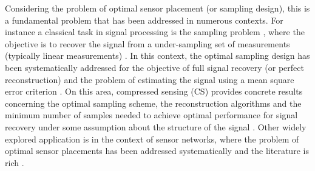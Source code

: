 {Considering the problem of optimal sensor placement (or sampling design), this is a fundamental problem that has been addressed in numerous contexts. For instance a classical task in signal processing is the sampling problem \citep{Eldar_2015a}, where the objective is to recover the signal from a under-sampling set of measurements (typically linear measurements) \citep{donoho_2006, candes_2006b,founcart_2009,vershynin_2012}. In this context, the optimal sampling design has been systematically addressed for the objective of full signal recovery (or perfect reconstruction) \citep{candes_2006,candes_2008,Boyko_2014} and the problem of estimating the signal using a mean square error criterion \citep{cohen_2009,Bui2015_a}. On this area, compressed sensing (CS) provides concrete results concerning the optimal sampling scheme, the reconstruction algorithms and the minimum number of samples needed to achieve optimal performance for signal recovery under some assumption about the structure of the signal \citep{candes_2008,baraniuk_2008}. Other widely explored application is in the context of sensor networks, where the problem of optimal sensor placements has been addressed systematically and the literature is rich \citep{Guestrin_2005, Krause_2006,Krause_2008a,Krause_2008b,Krause_2011, Bangerth_2005,Bangerth_2006}.}

